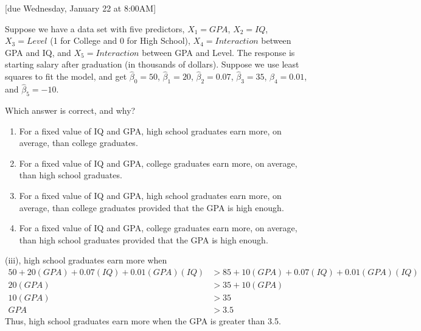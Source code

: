 \documentclass{article}
\begin{document}
[due Wednesday, January 22 at 8:00AM]

\begin{probset}

\begin{prob}
    Suppose we have a data set with five predictors, $X_1 = GPA$, $X_2 = IQ$, $X_3 = Level$ (1 for College and 0 for High School), $X_4 = Interaction$ between GPA and IQ, and $X_5 = Interaction$ between GPA and Level. The response is starting salary after graduation (in thousands of dollars). Suppose we use least squares to fit the model, and get $\hat{\beta}_0 = 50$, $\hat{\beta}_1 = 20$, $\hat{\beta}_2 = 0.07$, $\hat{\beta}_3 = 35$, $\hat{\beta}_4 = 0.01$, and $\hat{\beta}_5 = -10$.

    \begin{subprobset}
        \begin{subprob}
            Which answer is correct, and why?
            \begin{enumerate}[label=\roman*]
                \item For a fixed value of IQ and GPA, high school graduates earn more, on average, than college graduates.
                \item For a fixed value of IQ and GPA, college graduates earn more, on average, than high school graduates.
                \item For a fixed value of IQ and GPA, high school graduates earn more, on average, than college graduates provided that the GPA is high enough.
                \item For a fixed value of IQ and GPA, college graduates earn more, on average, than high school graduates provided that the GPA is high enough.
            \end{enumerate}

            \begin{soln}
                (iii), high school graduates earn more when
                \begin{align*}
                    50 + 20(GPA) + 0.07(IQ) + 0.01(GPA)(IQ) &> 85 + 10(GPA) + 0.07(IQ) + 0.01(GPA)(IQ) \\
                    20(GPA) &> 35 + 10(GPA) \\
                    10(GPA) &> 35 \\
                    GPA &> 3.5
                \end{align*}
                Thus, high school graduates earn more when the GPA is greater than 3.5.
            \end{soln}
        \end{subprob}


\end{subprobset}
\end{prob}
\end{probset}
\end{document}
